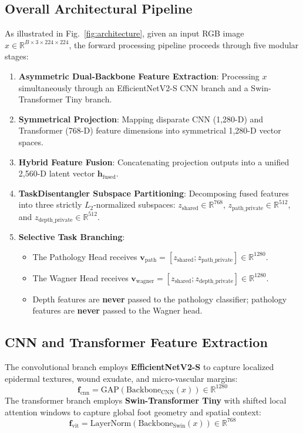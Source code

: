 \documentclass[journal]{IEEEtran}
\begin{document}
\subsection{Overall Architectural Pipeline}
As illustrated in Fig.~\ref{fig:architecture}, given an input RGB image $x \in \mathbb{R}^{B \times 3 \times 224 \times 224}$, the forward processing pipeline proceeds through five modular stages:
\begin{enumerate}
    \item \textbf{Asymmetric Dual-Backbone Feature Extraction}: Processing $x$ simultaneously through an EfficientNetV2-S CNN branch and a Swin-Transformer Tiny branch.
    \item \textbf{Symmetrical Projection}: Mapping disparate CNN (1,280-D) and Transformer (768-D) feature dimensions into symmetrical 1,280-D vector spaces.
    \item \textbf{Hybrid Feature Fusion}: Concatenating projection outputs into a unified 2,560-D latent vector $\mathbf{h}_{\text{fused}}$.
    \item \textbf{TaskDisentangler Subspace Partitioning}: Decomposing fused features into three strictly $L_2$-normalized subspaces: $z_{\text{shared}} \in \mathbb{R}^{768}$, $z_{\text{path\_private}} \in \mathbb{R}^{512}$, and $z_{\text{depth\_private}} \in \mathbb{R}^{512}$.
    \item \textbf{Selective Task Branching}:
    \begin{itemize}
        \item The Pathology Head receives $\mathbf{v}_{\text{path}} = [z_{\text{shared}}; z_{\text{path\_private}}] \in \mathbb{R}^{1280}$.
        \item The Wagner Head receives $\mathbf{v}_{\text{wagner}} = [z_{\text{shared}}; z_{\text{depth\_private}}] \in \mathbb{R}^{1280}$.
        \item Depth features are \textbf{never} passed to the pathology classifier; pathology features are \textbf{never} passed to the Wagner head.
    \end{itemize}
\end{enumerate}

\subsection{CNN and Transformer Feature Extraction}
The convolutional branch employs \textbf{EfficientNetV2-S} \cite{tan2021efficientnetv2} to capture localized epidermal textures, wound exudate, and micro-vascular margins:
\begin{equation}
    \mathbf{f}_{\text{cnn}} = \text{GAP}\left( \text{Backbone}_{\text{CNN}}(x) \right) \in \mathbb{R}^{1280}
\end{equation}
The transformer branch employs \textbf{Swin-Transformer Tiny} \cite{liu2021swin} with shifted local attention windows to capture global foot geometry and spatial context:
\begin{equation}
    \mathbf{f}_{\text{vit}} = \text{LayerNorm}\left( \text{Backbone}_{\text{Swin}}(x) \right) \in \mathbb{R}^{768}
\end{equation}
\end{document}
